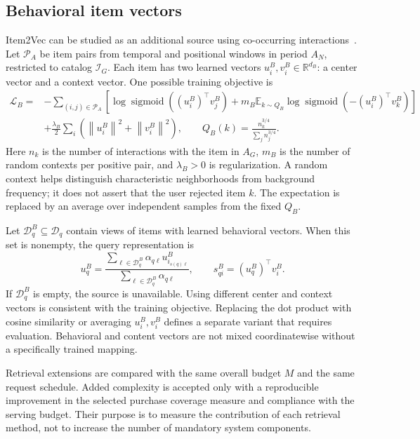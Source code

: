 \documentclass[12pt,a4paper]{article}
\newcommand{\R}{\mathbb R}
\newcommand{\E}{\mathbb E}
\newcommand{\norm}[1]{\left\lVert#1\right\rVert}
\DeclareMathOperator{\sigmoid}{sigmoid}
\theoremstyle{plainru}
\begin{document}
\subsection{Behavioral item vectors}

Item2Vec can be studied as an additional source
using co-occurring interactions~\cite{item2vec}.
Let $\mathcal P_A$ be item pairs from temporal and positional
windows in period $A_N$, restricted to catalog $\mathcal I_G$. Each item has
two learned vectors $u_i^{B},v_i^{B}\in\R^{d_B}$: a center vector and a context vector.
One possible training objective is
\begin{align}\label{eq:model-item2vec}
\mathcal L_B=&-\sum_{(i,j)\in\mathcal P_A}
\left[\log\sigmoid((u_i^{B})^\top v_j^{B})
+m_B\E_{k\sim Q_B}\log\sigmoid(-(u_i^{B})^\top v_k^{B})\right]
\nonumber\\
&+\frac{\lambda_B}{2}\sum_i(\norm{u_i^{B}}^2+\norm{v_i^{B}}^2),
\qquad Q_B(k)=\frac{n_k^{3/4}}{\sum_jn_j^{3/4}}.
\end{align}
Here $n_k$ is the number of interactions with the item in $A_G$,
$m_B$ is the number of random contexts per positive pair,
and $\lambda_B>0$ is regularization. A random context helps
distinguish characteristic neighborhoods from background frequency;
it does not assert that the user rejected item $k$.
The expectation is replaced by an average over independent
samples from the fixed $Q_B$.

Let $\mathcal D_q^B\subseteq\mathcal D_q$ contain views of items
with learned behavioral vectors. When this set is nonempty,
the query representation is
\begin{equation}\label{eq:model-item2vec-query}
u_q^B=\frac{\sum_{\ell\in\mathcal D_q^B}
\alpha_{q\ell}u_{i_{s(q)\ell}}^B}
{\sum_{\ell\in\mathcal D_q^B}\alpha_{q\ell}},
\qquad s_{qi}^B=(u_q^B)^\top v_i^B.
\end{equation}
If $\mathcal D_q^B$ is empty, the source is unavailable.
Using different center and context vectors
is consistent with the training objective. Replacing the dot product
with cosine similarity or averaging $u_i^{B},v_i^{B}$ defines a separate variant
that requires evaluation. Behavioral and content vectors
are not mixed coordinatewise without a specifically trained mapping.

Retrieval extensions are compared with the same overall budget
$M$ and the same request schedule. Added complexity
is accepted only with a reproducible improvement in the selected
purchase coverage measure and compliance with the serving budget.
Their purpose is to measure the contribution of each retrieval method,
not to increase the number of mandatory system components.
\end{document}
